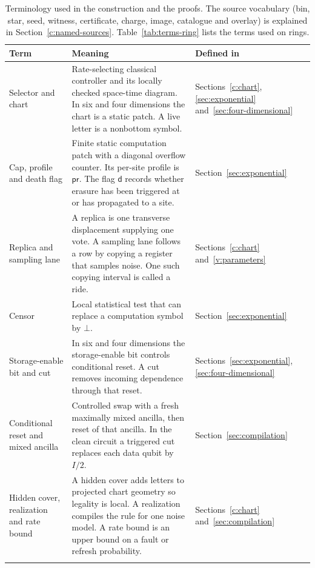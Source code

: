 \begin{table}[!tb]
\caption{Terminology used in the construction and the proofs. The source vocabulary (bin, star, seed, witness, certificate, charge, image, catalogue and overlay) is explained in Section~\ref{c:named-sources}. Table~\ref{tab:terms-ring} lists the terms used on rings.}\label{tab:terms}
\small\centering
\begin{tabular}{@{}>{\raggedright\arraybackslash}p{.23\linewidth}>{\raggedright\arraybackslash}p{.51\linewidth}>{\raggedright\arraybackslash}p{.19\linewidth}@{}}
\toprule Term & Meaning & Defined in\\\midrule
Selector and chart & Rate-selecting classical controller and its locally checked space-time diagram. In six and four dimensions the chart is a static patch. A live letter is a nonbottom symbol. & Sections~\ref{c:chart}, \ref{sec:exponential} and~\ref{sec:four-dimensional}\\\addlinespace[3pt]
Cap, profile and death flag & Finite static computation patch with a diagonal overflow counter. Its per-site profile is \(\mathsf{pr}\). The flag \(\mathsf d\) records whether erasure has been triggered at or has propagated to a site. & Section~\ref{sec:exponential}\\\addlinespace[3pt]
Replica and sampling lane & A replica is one transverse displacement supplying one vote. A sampling lane follows a row by copying a register that samples noise. One such copying interval is called a ride. & Sections~\ref{c:chart} and~\ref{v:parameters}\\\addlinespace[3pt]
Censor & Local statistical test that can replace a computation symbol by \(\bot\). & Section~\ref{sec:exponential}\\\addlinespace[3pt]
Storage-enable bit and cut & In six and four dimensions the storage-enable bit controls conditional reset. A cut removes incoming dependence through that reset. & Sections~\ref{sec:exponential}, \ref{sec:four-dimensional}\\\addlinespace[3pt]
Conditional reset and mixed ancilla & Controlled swap with a fresh maximally mixed ancilla, then reset of that ancilla. In the clean circuit a triggered cut replaces each data qubit by \(I/2\). & Section~\ref{sec:compilation}\\\addlinespace[3pt]
Hidden cover, realization and rate bound & A hidden cover adds letters to projected chart geometry so legality is local. A realization compiles the rule for one noise model. A rate bound is an upper bound on a fault or refresh probability. & Sections~\ref{c:chart} and~\ref{sec:compilation}\\\addlinespace[3pt]

\end{tabular}
\end{table}
